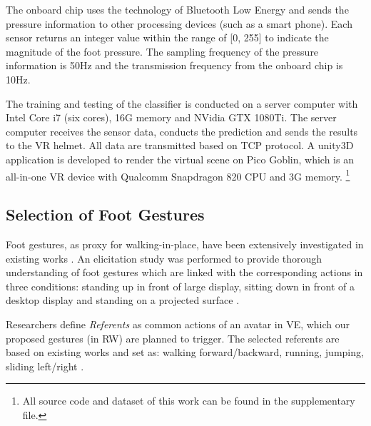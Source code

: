 \documentclass[review]{vgtc}                 %
\begin{document}
The onboard chip uses the technology of Bluetooth Low Energy and sends the pressure information to other processing devices (such as a smart phone). 
Each sensor returns an integer value within the range of [0, 255] to indicate the magnitude of the foot pressure. 
The sampling frequency of the pressure information is 50Hz and the transmission frequency from the onboard chip is 10Hz. 

The training and testing of the classifier is conducted on a server computer with Intel Core i7 (six cores), 16G memory and NVidia GTX 1080Ti. 
The server computer receives the sensor data, conducts the prediction and sends the results to the VR helmet.
All data are transmitted based on TCP protocol.
A unity3D application is developed to render the virtual scene on Pico Goblin, which is an all-in-one VR device with Qualcomm Snapdragon 820 CPU and 3G memory. 
\footnote{All source code and dataset of this work can be found in the supplementary file.}


\subsection{Selection of Foot Gestures}
Foot gestures, as proxy for walking-in-place, have been extensively investigated in existing works \cite{yan2004new, wendt2010gud, feasel2008llcm, bruno2013new,nilsson2016walking,nilsson2018natural}.
An elicitation study was performed to provide thorough understanding of foot gestures which are linked with the corresponding actions in three conditions: standing up in front of large display, sitting down in front of a desktop display and standing on a projected surface \cite{felberbaum2018better}.

Researchers define \emph{Referents} \cite{felberbaum2018better} as common actions of an avatar in VE, which our proposed gestures (in RW) are planned to trigger.
The selected referents are based on existing works and set as: walking forward/backward, running, jumping, sliding left/right \cite{lee1998control,felberbaum2018better}.
\end{document}
